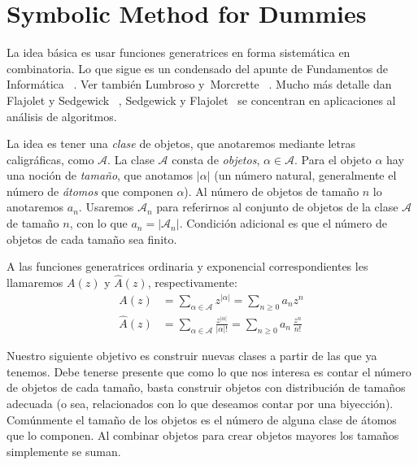 

\chapter{Symbolic Method for Dummies}
\label{apx:symbolic-method-dummies}

  La idea básica es usar funciones generatrices en forma sistemática
  en combinatoria.
  Lo que sigue es un condensado del apunte de Fundamentos de Informática~%
    \cite[capítulo~21]{brand17:_fundamentos_informatica}.
  Ver también Lumbroso y~Morcrette~%
    \cite{lumbroso12:_gentle_intro_analy_combin}.
  Mucho más detalle dan Flajolet y Sedgewick~%
    \cite{flajolet09:_analy_combin},
  Sedgewick y Flajolet~%
    \cite{sedgewick13:_introd_anal_algor}
  se concentran en aplicaciones al análisis de algoritmos.

  La idea es tener una \emph{clase} de objetos,
  que anotaremos mediante letras caligráficas,
  como \(\mathscr{A}\).
  La clase \(\mathscr{A}\) consta de \emph{objetos},
  \(\alpha \in \mathscr{A}\).
  Para el objeto \(\alpha\) hay una noción de \emph{tamaño},
  que anotamos \(\lvert \alpha \rvert\)
  (un número natural,
   generalmente el número de \emph{átomos} que componen \(\alpha\)).
  Al número de objetos de tamaño \(n\) lo anotaremos \(a_n\).
  Usaremos \(\mathscr{A}_n\)
  para referirnos al conjunto de objetos de la clase \(\mathscr{A}\)
  de tamaño \(n\),
  con lo que \(a_n = \lvert \mathscr{A}_n \rvert\).
  Condición adicional es
  que el número de objetos de cada tamaño sea finito.

  A las funciones generatrices ordinaria y exponencial
  correspondientes
  les llamaremos \(A(z)\) y \(\widehat{A}(z)\),
  respectivamente:
  \begin{align*}
    A(z)
      &= \sum_{\alpha \in \mathscr{A}} z^{\lvert \alpha \rvert}
       = \sum_{n \ge 0} a_n z^n \\
    \widehat{A}(z)
      &= \sum_{\alpha \in \mathscr{A}}
           \frac{z^{\lvert \alpha \rvert}}{\lvert \alpha \rvert !}
       = \sum_{n \ge 0} a_n \, \frac{z^n}{n!}
  \end{align*}

  Nuestro siguiente objetivo es construir nuevas clases
  a partir de las que ya tenemos.
  Debe tenerse presente que como lo que nos interesa
  es contar el número de objetos de cada tamaño,
  basta construir objetos con distribución de tamaños adecuada
  (o sea,
   relacionados con lo que deseamos contar por una biyección).
  Comúnmente el tamaño de los objetos es el número de alguna clase de átomos
  que lo componen.
  Al combinar objetos para crear objetos mayores
  los tamaños simplemente se suman.

